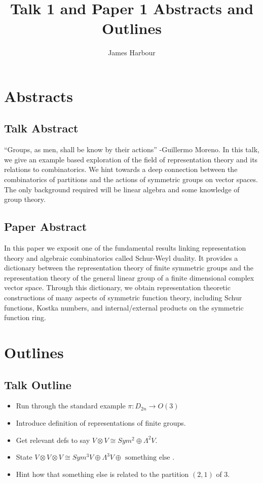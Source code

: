 \documentclass[12pt]{article}
\title{Talk 1 and Paper 1 Abstracts and Outlines }
\author{James Harbour}
\begin{document}
\maketitle


\section{Abstracts}
\subsection*{Talk Abstract}
``Groups, as men, shall be know by their actions'' -Guillermo Moreno. In this talk, we give an example based exploration of the field of representation theory and its relations to combinatorics. We hint towards a deep connection between the combinatorics of partitions and the actions of symmetric groups on vector spaces. The only background required will be linear algebra and some knowledge of group theory.


\subsection*{Paper Abstract}
In this paper we exposit one of the fundamental results linking representation theory and algebraic combinatorics called Schur-Weyl duality. It provides a dictionary between the representation theory of finite symmetric groups and the representation theory of the general linear group of a finite dimensional complex vector space. Through this dictionary, we obtain representation theoretic constructions of many aspects of symmetric function theory, including Schur functions, Kostka numbers, and internal/external products on the symmetric function ring.

\newpage
\section{Outlines}

\subsection{Talk Outline}
\begin{itemize}
  \item Run through the standard example $ \pi:  D_{2n} \to O(3) $
  \item Introduce definition of representations of finite groups.
  \item Get relevant defs to say $ V\otimes V \cong Sym^{2} \oplus \Lambda^{2}V$.
  \item State $ V\otimes V\otimes V \cong Sym^{3}V \oplus \Lambda^{3}V \oplus \text{ something else }$.
  \item Hint how that something else is related to the partition $ (2,1) $ of $ 3 $.
\end{itemize}
\end{document}
